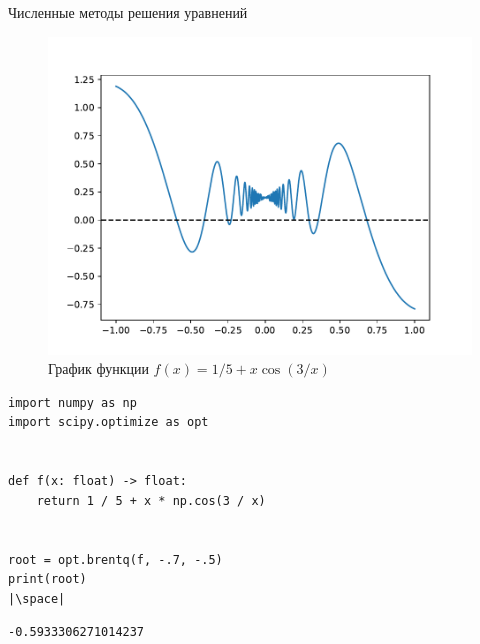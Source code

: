 \documentclass[aspectratio=169, mathserif]{beamer}	%
\begin{document}
\begin{frame}[fragile, label=c]{Численные методы решения уравнений}
\scriptsize
\begin{minipage}{.55\textwidth}
\begin{figure}[h!]
 	\centering
 	\includegraphics[width=\linewidth]{./pics/Figure_41}
 	\caption{График функции $f(x) = 1/5 + x\cos\left(3/x\right)$}
 	\label{fig:figure_41}
 \end{figure}
\end{minipage}
\begin{minipage}{.03\textwidth}
\hfill
\end{minipage}
\begin{minipage}{.3\textwidth}
\begin{verbatim}
import numpy as np
import scipy.optimize as opt


def f(x: float) -> float:
    return 1 / 5 + x * np.cos(3 / x)


root = opt.brentq(f, -.7, -.5)
print(root)
|\space|
\end{verbatim}
\begin{verbatim}
-0.5933306271014237
\end{verbatim}
\end{minipage}
\vfill
\end{frame}
\end{document}
